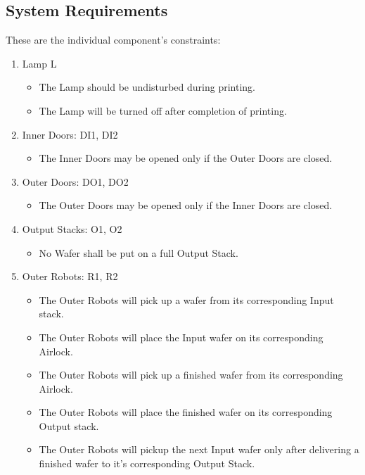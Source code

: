 \documentclass[a4paper,12pt]{article}
\begin{document}
\subsection{System Requirements}
These are the individual component's constraints:
\begin{enumerate}
\item Lamp L
	\begin{itemize}
	\item The Lamp should be undisturbed during printing.
	\item The Lamp will be turned off after completion of printing.	
	\end{itemize}
\item Inner Doors: DI1, DI2
	\begin{itemize}
	\item The Inner Doors may be opened only if the Outer Doors are closed.
	\end{itemize}

\item Outer Doors: DO1, DO2 
	\begin{itemize}
	\item The Outer Doors may be opened only if the Inner Doors are closed.
	\end{itemize}

\item Output Stacks: O1, O2
	\begin{itemize}
	\item No Wafer shall be put on a full Output Stack.  
	\end{itemize}

\item Outer Robots: R1, R2
	\begin{itemize}
	\item The Outer Robots will pick up a wafer from its corresponding Input stack.
	\item The Outer Robots will place the Input wafer on its corresponding Airlock.
	\item The Outer Robots will pick up a finished wafer from its corresponding Airlock.
	\item The Outer Robots will place the finished wafer on its corresponding Output stack.
	\item The Outer Robots will pickup the next Input wafer only after delivering a finished wafer to it's corresponding Output Stack.
	\end{itemize}


\end{enumerate}
\end{document}
